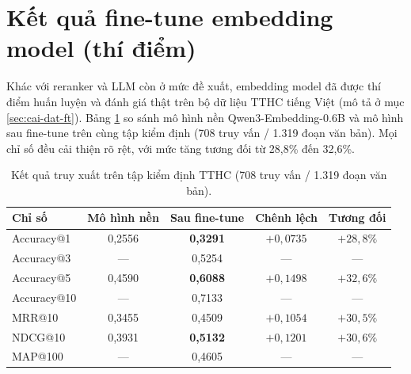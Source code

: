\section{Kết quả fine-tune embedding model (thí điểm)}
\label{sec:kq-ft}

Khác với reranker và LLM còn ở mức đề xuất, embedding model đã được thí điểm huấn luyện và
đánh giá thật trên bộ dữ liệu TTHC tiếng Việt (mô tả ở mục \ref{sec:cai-dat-ft}). Bảng
\ref{tab:ft-results} so sánh mô hình nền Qwen3-Embedding-0.6B và mô hình sau fine-tune trên
cùng tập kiểm định (708 truy vấn / 1.319 đoạn văn bản). Mọi chỉ số đều cải thiện rõ rệt, với
mức tăng tương đối từ 28,8\% đến 32,6\%.

\begin{table}[htbp]
\centering
\caption{Kết quả truy xuất trên tập kiểm định TTHC (708 truy vấn / 1.319 đoạn văn bản).}
\label{tab:ft-results}
\small
\begin{tabular}{@{}lcccc@{}}
\toprule
\textbf{Chỉ số} & \textbf{Mô hình nền} & \textbf{Sau fine-tune} & \textbf{Chênh lệch} & \textbf{Tương đối} \\
\midrule
Accuracy@1  & 0{,}2556 & \textbf{0{,}3291} & $+0{,}0735$ & $+28{,}8\%$ \\
Accuracy@3  & ---      & 0{,}5254 & ---        & --- \\
Accuracy@5  & 0{,}4590 & \textbf{0{,}6088} & $+0{,}1498$ & $+32{,}6\%$ \\
Accuracy@10 & ---      & 0{,}7133 & ---        & --- \\
MRR@10      & 0{,}3455 & 0{,}4509 & $+0{,}1054$ & $+30{,}5\%$ \\
NDCG@10     & 0{,}3931 & \textbf{0{,}5132} & $+0{,}1201$ & $+30{,}6\%$ \\
MAP@100     & ---      & 0{,}4605 & ---        & --- \\
\bottomrule
\end{tabular}
\end{table}

